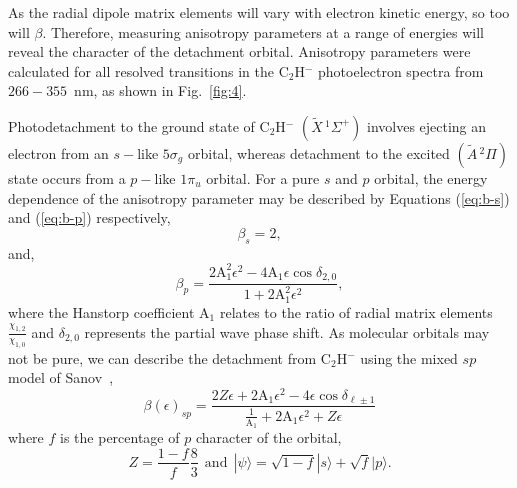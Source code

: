 \documentclass[journal=jpcafh,manuscript=article,layout=onecolumn, 12pt]{achemso}
\begin{document}
As the radial dipole matrix elements will vary with electron kinetic energy, so too will $\beta$. Therefore, measuring anisotropy parameters at a range of energies will reveal the character of the detachment orbital. Anisotropy parameters were calculated for all resolved transitions in the C$_2$H$^-$ photoelectron spectra from $266-355$~nm, as shown in Fig.~\ref{fig:4}.




Photodetachment to the ground state of C$_2$H$^-$ $(\tilde{X}\,^1\Sigma^+)$ involves ejecting an electron from an $s-$like $5\sigma_g$ orbital, whereas detachment to the excited $(\tilde{A}\,^2\Pi)$ state occurs from a $p-$like $1\pi_u$ orbital.  For a pure $s$ and $p$ orbital, the energy dependence of the anisotropy parameter may be described by Equations (\ref{eq:b-s}) and (\ref{eq:b-p}) respectively,
\begin{equation}
\beta_s = 2,
\label{eq:b-s}
\end{equation}
and,
\begin{equation}
\beta_p = \frac{2\text{A}_1^2\epsilon^2-4\text{A}_1\epsilon\cos\delta_{2,0}}{1+2\text{A}_1^2\epsilon^2},
\label{eq:b-p}
\end{equation}
where the Hanstorp coefficient A$_1$ relates to the ratio of radial matrix elements $\frac{\chi_{1,2}}{\chi_{1,0}}$ and $\delta_{2,0}$ represents the partial wave phase shift. As molecular orbitals may not be pure, we can describe the detachment from C$_2$H$^-$ using the mixed $sp$ model of Sanov~\cite{san14},
\begin{equation}
\beta(\epsilon)_{sp} = \frac{2Z\epsilon+2\text{A}_1\epsilon^2-4\epsilon\cos\delta_{\ell\pm 1}}{\frac{1}{\text{A}_1}+2\text{A}_1\epsilon^2+Z\epsilon}
\label{eq:beta-sanov}
\end{equation}  
where $f$ is the percentage of $p$ character of the orbital,
\begin{equation}
Z = \frac{1-f}{f}\frac{8}{3}~~ \text{and} ~~ |\psi\rangle = \sqrt{1-f}|s\rangle + \sqrt{f}|p\rangle.
\end{equation}
\end{document}
